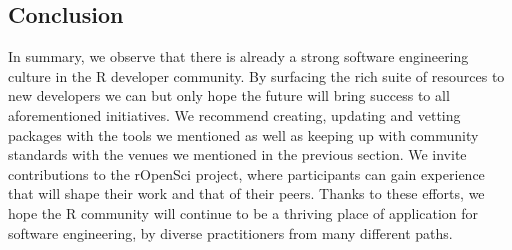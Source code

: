 \hypertarget{conclusion}{%
\subsection{Conclusion}\label{conclusion}}

In summary, we observe that there is already a strong software
engineering culture in the R developer community. By surfacing the rich
suite of resources to new developers we can but only hope the future
will bring success to all aforementioned initiatives. We recommend
creating, updating and vetting packages with the tools we mentioned as
well as keeping up with community standards with the venues we mentioned
in the previous section. We invite contributions to the rOpenSci
project, where participants can gain experience that will shape their
work and that of their peers. Thanks to these efforts, we hope the R
community will continue to be a thriving place of application for
software engineering, by diverse practitioners from many different
paths.



\address{%
Maëlle Salmon\\
The rOpenSci Project\\%
\\ \\
%
\url{https://masalmon.eu}\\%
\textit{ORCiD: \href{https://orcid.org/0000-0002-2815-0399}{0000-0002-2815-0399}}\\%
\href{mailto:msmaellesalmon@gmail.com}{\nolinkurl{msmaellesalmon@gmail.com}}%
}

\address{%
Karthik Ram\\
Berkeley Institute for Data Science and The rOpenSci Project\\%
\\ \\
%
\url{https://ram.berkeley.edu/}\\%
\textit{ORCiD: \href{https://orcid.org/0000-0002-0233-1757}{0000-0002-0233-1757}}\\%
\href{mailto:karthik.ram@berkeley.edu}{\nolinkurl{karthik.ram@berkeley.edu}}%
}
